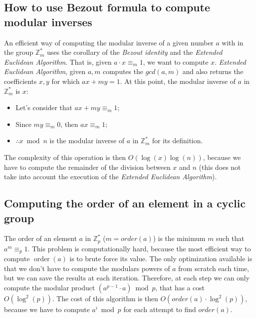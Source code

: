 \subsection{How to use Bezout formula to compute modular inverses}
An efficient way of computing the modular inverse of a given number $a$ with in the group $\mathbb{Z}_{m}^{*}$ uses the corollary of the \emph{Bezout identity} and the \emph{Extended Euclidean Algorithm}.\newline
That is, given $a \cdot x \equiv_{m} 1$, we want to compute $x$.\newline
\emph{Extended Euclidean Algorithm}, given $a, m$ computes the $gcd(a,m)$ and also returns the coefficients $x,y$ for which $ax + my = 1$. \newline
At this point, the modular inverse of $a$ in $\mathbb{Z}_{m}^{*}$ is $x$:
\begin{itemize}
    \item Let's consider that $ax + my \equiv_{m} 1$;
    \item Since $my \equiv_{m} 0$, then $ax \equiv_{m} 1$;
    \item $\therefore x \bmod n$ is the modular inverse of $a$ in $\mathbb{Z}_{m}^{*}$ for its definition.
\end{itemize}
The complexity of this operation is then $O(\operatorname{log}(x)\operatorname{log}(n))$, because we have to compute the remainder of the division between $x$ and $n$ (this does not take into account the execution of the \emph{Extended Euclidean Algorithm}).

\subsection{Computing the order of an element in a cyclic group}
The order of an element $a$ in $\mathbb{Z}_{p}^{*}$ ($m = order(a)$) is the minimum $m$ such that $a^{m} \equiv_{p} 1$.\newline
This problem is computationally hard, because the most efficient way to compute $\operatorname{order}(a)$ is to brute force its value.\newline
The only optimization available is that we don't have to compute the modulars powers of $a$ from scratch each time, but we can save the results at each iteration. Therefore, at each step we can only compute the modular product $(a^{p-1} \cdot a) \bmod p$, that has a cost $O(\operatorname{log}^{2}(p))$.
The cost of this algorithm is then $O(order(a) \cdot \operatorname{log}^{2}(p))$, because we have to compute $a^{i} \bmod p$ for each attempt to find $order(a)$.

